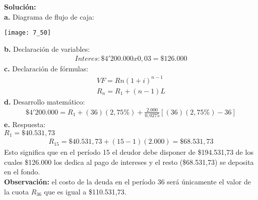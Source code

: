 \textbf{Solución:}\\
\textbf{a.}	Diagrama de flujo de caja:
\begin{center}
	\texttt{[image: 7\_50]}
\end{center}
\textbf{b.}	Declaración de variables:
\begin{align*}
	Interes: 	\$4'200.000 x  0,03 = \$126.000
\end{align*}
\textbf{c.}	Declaración de fórmulas:
\begin{align*}
	VF=Rn(1+i)^{n-1}\\
	R_{n}= R_{1}+ (n- 1)L
\end{align*}
\textbf{d.}	Desarrollo matemático:
\begin{align*}
	\$4'200.000 = R_{1} + (36)(2,75\%)+  \frac{2.000}{0,0275}  [(36)(2,75\%)-36]
\end{align*}
\textbf{e.}	Respuesta:\\

	$R_{1}=\$40.531,73$\\

	  
\begin{align*}
	R_{15}=\$40.531,73 + (15 -1)(2.000) = \$68.531,73
\end{align*}
Esto significa que en el período 15 el deudor debe disponer de \$194.531,73 de los cuales \$126.000 los dedica al pago de intereses y el resto (\$68.531,73) se deposita en el fondo.\\

\textbf{Observación:} el costo de la deuda en el período 36 será únicamente el valor de la cuota $R_{36}$ que es igual a \$110.531,73.

